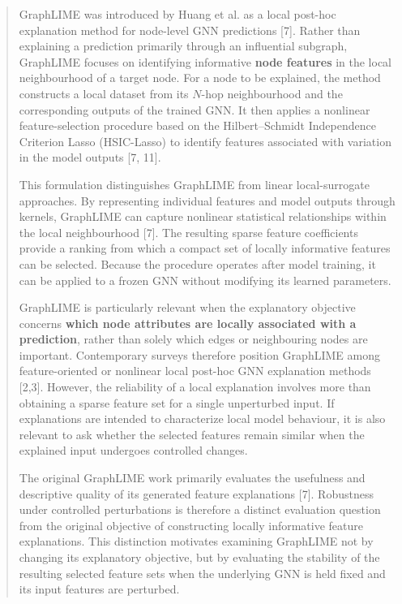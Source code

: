\documentclass[a4paper]{article}
\begin{document}
\begin{quote}
GraphLIME was introduced by Huang et al. as a local post-hoc explanation
method for node-level GNN predictions {[}7{]}. Rather than explaining a
prediction primarily through an influential subgraph, GraphLIME focuses
on identifying informative \textbf{node features} in the local
neighbourhood of a target node. For a node to be explained, the method
constructs a local dataset from its \(N\)-hop neighbourhood and the
corresponding outputs of the trained GNN. It then applies a nonlinear
feature-selection procedure based on the Hilbert--Schmidt Independence
Criterion Lasso (HSIC-Lasso) to identify features associated with
variation in the model outputs {[}7, 11{]}.

This formulation distinguishes GraphLIME from linear local-surrogate
approaches. By representing individual features and model outputs
through kernels, GraphLIME can capture nonlinear statistical
relationships within the local neighbourhood {[}7{]}. The resulting
sparse feature coefficients provide a ranking from which a compact set
of locally informative features can be selected. Because the procedure
operates after model training, it can be applied to a frozen GNN without
modifying its learned parameters.

GraphLIME is particularly relevant when the explanatory objective
concerns \textbf{which node attributes are locally associated with a
prediction}, rather than solely which edges or neighbouring nodes are
important. Contemporary surveys therefore position GraphLIME among
feature-oriented or nonlinear local post-hoc GNN explanation methods
{[}2,3{]}. However, the reliability of a local explanation involves more
than obtaining a sparse feature set for a single unperturbed input. If
explanations are intended to characterize local model behaviour, it is
also relevant to ask whether the selected features remain similar when
the explained input undergoes controlled changes.

The original GraphLIME work primarily evaluates the usefulness and
descriptive quality of its generated feature explanations {[}7{]}.
Robustness under controlled perturbations is therefore a distinct
evaluation question from the original objective of constructing locally
informative feature explanations. This distinction motivates examining
GraphLIME not by changing its explanatory objective, but by evaluating
the stability of the resulting selected feature sets when the underlying
GNN is held fixed and its input features are perturbed.
\end{quote}
\end{document}
